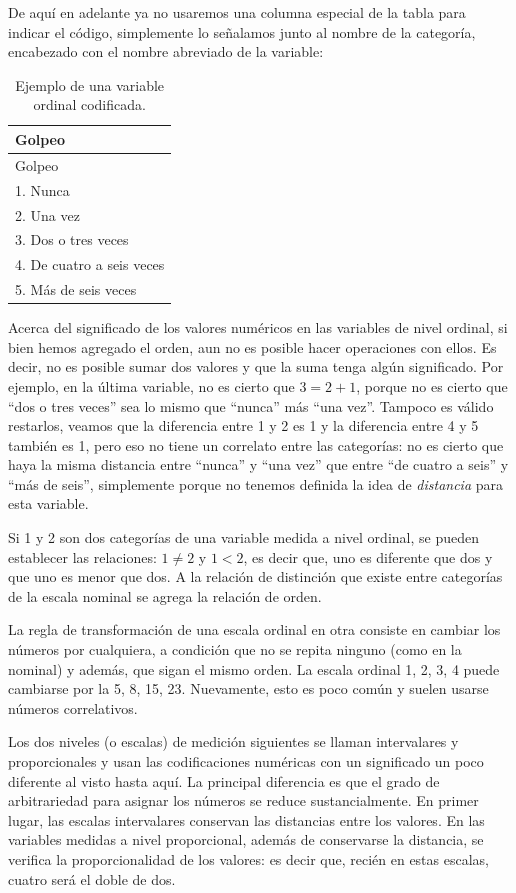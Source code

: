 \documentclass[]{book}
\begin{document}
De aquí en adelante ya no usaremos una columna especial de la tabla para indicar el código, simplemente lo señalamos junto al nombre de la categoría, encabezado con el nombre abreviado de la variable:

\begin{longtable}[]{@{}l@{}}
\caption{\label{tab:unnamed-chunk-30}Ejemplo de una variable ordinal codificada.}\tabularnewline
\toprule
Golpeo\tabularnewline
\midrule
\endfirsthead
\toprule
Golpeo\tabularnewline
\midrule
\endhead
1. Nunca\tabularnewline
2. Una vez\tabularnewline
3. Dos o tres veces\tabularnewline
4. De cuatro a seis veces\tabularnewline
5. Más de seis veces\tabularnewline
\bottomrule
\end{longtable}

Acerca del significado de los valores numéricos en las variables de nivel ordinal, si bien hemos agregado el orden, aun no es posible hacer operaciones con ellos. Es decir, no es posible sumar dos valores y que la suma tenga algún significado. Por ejemplo, en la última variable, no es cierto que \(3 = 2+1\), porque no es cierto que ``dos o tres veces'' sea lo mismo que ``nunca'' más ``una vez''. Tampoco es válido restarlos, veamos que la diferencia entre 1 y 2 es 1 y la diferencia entre 4 y 5 también es 1, pero eso no tiene un correlato entre las categorías: no es cierto que haya la misma distancia entre ``nunca'' y ``una vez'' que entre ``de cuatro a seis'' y ``más de seis'', simplemente porque no tenemos definida la idea de \emph{distancia} para esta variable.

Si 1 y 2 son dos categorías de una variable medida a nivel ordinal, se pueden establecer las relaciones: \(1 \neq 2\) y \(1<2\), es decir que, uno es diferente que dos y que uno es menor que dos. A la relación de distinción que existe entre categorías de la escala nominal se agrega la relación de orden.

La regla de transformación de una escala ordinal en otra consiste en cambiar los números por cualquiera, a condición que no se repita ninguno (como en la nominal) y además, que sigan el mismo orden. La escala ordinal 1, 2, 3, 4 puede cambiarse por la 5, 8, 15, 23. Nuevamente, esto es poco común y suelen usarse números correlativos.

Los dos niveles (o escalas) de medición siguientes se llaman intervalares y proporcionales y usan las codificaciones numéricas con un significado un poco diferente al visto hasta aquí. La principal diferencia es que el grado de arbitrariedad para asignar los números se reduce sustancialmente. En primer lugar, las escalas intervalares conservan las distancias entre los valores. En las variables medidas a nivel proporcional, además de conservarse la distancia, se verifica la proporcionalidad de los valores: es decir que, recién en estas escalas, cuatro será el doble de dos.
\end{document}

